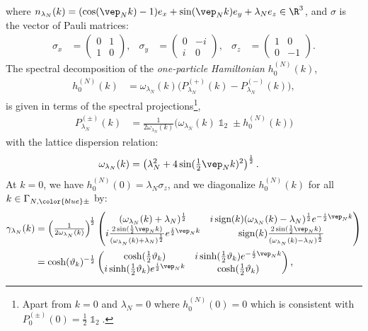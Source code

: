 \documentclass[a4paper, 11pt]{article}
\DeclareMathOperator{\1}{\mathds{1}}
\DeclareMathOperator{\sign}{\textup{sign}}
\begin{document}
where $n_{\lambda_{N}}(k) = (\cos(\vep_{N}k)-1)e_{x} + \sin(\vep_{N}k)e_{y} + \lambda_{N}e_{z}\in\R^{3}$, and $\sigma$ is the vector of Pauli matrices:
\begin{align}
\label{eq:pauli}
\sigma_{x} & = \begin{pmatrix} 0 & 1 \\ 1 & 0 \end{pmatrix}, & \sigma_{y} & = \begin{pmatrix} 0 & -i \\ i & 0 \end{pmatrix}, & \sigma_{z} & = \begin{pmatrix} 1 & 0 \\ 0 & -1 \end{pmatrix}.
\end{align}
The spectral decomposition of the \textit{one-particle Hamiltonian} $h^{(N)}_{0}(k)$,
\begin{align}
\label{eq:1pHdiag}
h^{(N)}_{0}(k) & = \omega_{\lambda_{N}}(k)\Big(P^{(+)}_{\lambda_{N}}(k)-P^{(-)}_{\lambda_{N}}(k)\Big),
\end{align}
is given in terms of the spectral projections\footnote{Apart from $k=0$ and $\lambda_{N}=0$ where $h^{(N)}_{0}(0)=0$ which is consistent with $P^{(\pm)}_{0}(0) = \tfrac{1}{2}\1_{2}$.},
\begin{align}
\label{eq:1pproj}
P^{(\pm)}_{\lambda_{N}}(k) & = \tfrac{1}{2\omega_{\lambda_{N}}(k)}\big(\omega_{\lambda_{N}}(k)\1_{2}\pm h^{(N)}_{0}(k)\big)
\end{align}
with the lattice dispersion relation:
\begin{align}
\label{eq:lattdisp}
\omega_{\lambda_{N}}(k) & = \left(\lambda_{N}^{2}+4\sin(\tfrac{1}{2}\vep_{N}k)^{2}\right)^{\frac{1}{2}}.
\end{align}
At $k=0$, we have $h^{(N)}_{0}(0)=\lambda_{N}\sigma_{z}$, and we diagonalize $h^{(N)}_{0}(k)$ for all $k\in\Gamma_{N,{\color{blue}\pm}}$ by:
\begin{align}
\label{eq:stagHbog}
\gamma_{\lambda_{N}}(k) & = \Big(\tfrac{1}{2\omega_{\lambda_{N}}(k)}\Big)^{\!\frac{1}{2}}\begin{pmatrix} (\omega_{\lambda_{N}}(k)+\lambda_{N})^{\frac{1}{2}} & i\sign(k)(\omega_{\lambda_{N}}(k)-\lambda_{N})^{\frac{1}{2}}e^{-\frac{i}{2}\vep_{N}k} \\ i\frac{2\sin(\frac{1}{2}\vep_{N}k)}{(\omega_{\lambda_{N}}(k)+\lambda_{N})^{\frac{1}{2}}}e^{\frac{i}{2}\vep_{N}k} & \sign(k)\frac{2\sin(\frac{1}{2}\vep_{N}k)}{(\omega_{\lambda_{N}}(k)-\lambda_{N})^{\frac{1}{2}}} \end{pmatrix} \\ \nonumber
& = \cosh(\vartheta_{k})^{-\frac{1}{2}}\begin{pmatrix} \cosh(\frac{1}{2}\vartheta_{k}) & i\sinh(\frac{1}{2}\vartheta_{k})e^{-\frac{i}{2}\vep_{N}k} \\ i\sinh(\frac{1}{2}\vartheta_{k})e^{\frac{i}{2}\vep_{N}k} & \cosh(\frac{1}{2}\vartheta_{k}) \end{pmatrix},
\end{align}
\end{document}
